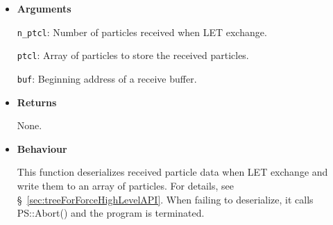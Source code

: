 \begin{itemize}

\item {\bf Arguments}

  \texttt{n\_ptcl}: Number of particles received when LET exchange. 
                       
  \texttt{ptcl}: Array of particles to store the received particles.
                       
  \texttt{buf}: Beginning address of a receive buffer.

\item {\bf Returns}

  None.

\item {\bf Behaviour}

 This function deserializes received particle data when LET exchange and write them to an array of particles. For details, see \S~\ref{sec:treeForForceHighLevelAPI}. When failing to deserialize, it calls PS::Abort() and the program is terminated.

\end{itemize}
